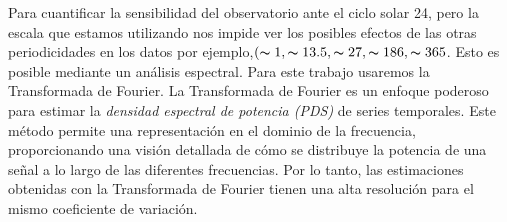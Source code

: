 

Para cuantificar la sensibilidad del observatorio ante el ciclo solar 24, pero la escala que estamos utilizando nos impide ver los posibles efectos de las otras periodicidades en los datos por ejemplo,$( \thicksim 1, \thicksim13.5,\thicksim27, \thicksim186, \thicksim365$. Esto es posible mediante un análisis espectral. Para este trabajo usaremos la Transformada de Fourier. La Transformada de Fourier es un enfoque poderoso para estimar la \textit{densidad espectral de potencia (PDS)} de series temporales. Este método permite una representación en el dominio de la frecuencia, proporcionando una visión detallada de cómo se distribuye la potencia de una señal a lo largo de las diferentes frecuencias. Por lo tanto, las estimaciones obtenidas con la Transformada de Fourier tienen una alta resolución para el mismo coeficiente de variación.

